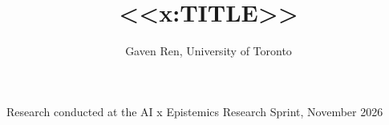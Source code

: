 \documentclass[10.5pt]{extarticle}
\title{\vspace{-2.2em}\Large\textbf{<<x:TITLE>>}}
\author{\normalsize Gaven Ren, University of Toronto}
\date{}
\begin{document}
\maketitle
\vspace{-3.4em}
\begin{center}\small Research conducted at the AI x Epistemics Research Sprint, November 2026\end{center}
\end{document}
